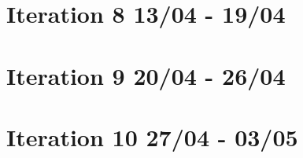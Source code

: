 \section{Iteration 8 13/04 - 19/04}



\section{Iteration 9 20/04 - 26/04}



\section{Iteration 10 27/04 - 03/05}

